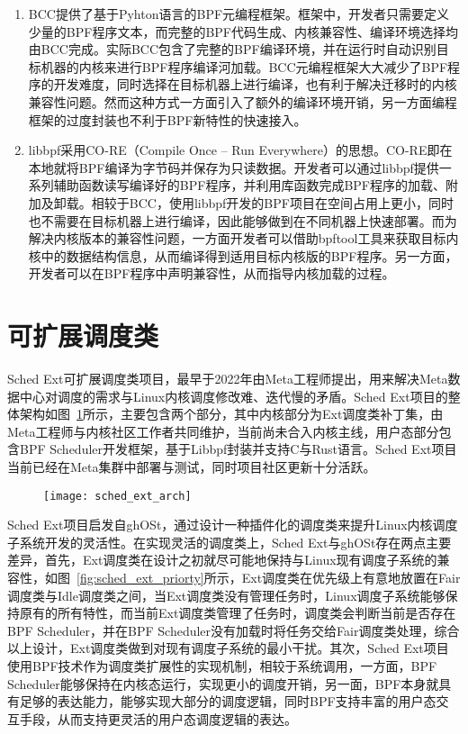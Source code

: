 \begin{enumerate}
    \item BCC提供了基于Pyhton语言的BPF元编程框架。框架中，开发者只需要定义少量的BPF程序文本，而完整的BPF代码生成、内核兼容性、编译环境选择均由BCC完成。实际BCC包含了完整的BPF编译环境，并在运行时自动识别目标机器的内核来进行BPF程序编译河加载。BCC元编程框架大大减少了BPF程序的开发难度，同时选择在目标机器上进行编译，也有利于解决迁移时的内核兼容性问题。然而这种方式一方面引入了额外的编译环境开销，另一方面编程框架的过度封装也不利于BPF新特性的快速接入。
    \item libbpf采用CO-RE（Compile Once – Run Everywhere）的思想。CO-RE即在本地就将BPF编译为字节码并保存为只读数据。开发者可以通过libbpf提供一系列辅助函数读写编译好的BPF程序，并利用库函数完成BPF程序的加载、附加及卸载。相较于BCC，使用libbpf开发的BPF项目在空间占用上更小，同时也不需要在目标机器上进行编译，因此能够做到在不同机器上快速部署。而为解决内核版本的兼容性问题，一方面开发者可以借助bpftool工具来获取目标内核中的数据结构信息，从而编译得到适用目标内核版的BPF程序。另一方面，开发者可以在BPF程序中声明兼容性，从而指导内核加载的过程。
\end{enumerate}

\section{可扩展调度类}

Sched Ext可扩展调度类项目\citep{schedext}，最早于2022年由Meta工程师提出，用来解决Meta数据中心对调度的需求与Linux内核调度修改难、迭代慢的矛盾。Sched Ext项目的整体架构如图~\ref{fig:sched_ext_arch}所示，主要包含两个部分，其中内核部分为Ext调度类补丁集，由Meta工程师与内核社区工作者共同维护，当前尚未合入内核主线，用户态部分包含BPF Scheduler开发框架，基于Libbpf封装并支持C与Rust语言。Sched Ext项目当前已经在Meta集群中部署与测试，同时项目社区更新十分活跃。

\begin{figure}[!htbp]
    \centering
    \texttt{[image: sched\_ext\_arch]}
    \label{fig:sched_ext_arch}
\end{figure}

Sched Ext项目启发自ghOSt\citep{humphries2021ghost}，通过设计一种插件化的调度类来提升Linux内核调度子系统开发的灵活性。在实现灵活的调度类上，Sched Ext与ghOSt存在两点主要差异，首先，Ext调度类在设计之初就尽可能地保持与Linux现有调度子系统的兼容性，如图~\ref{fig:sched_ext_priorty}所示，Ext调度类在优先级上有意地放置在Fair调度类与Idle调度类之间，当Ext调度类没有管理任务时，Linux调度子系统能够保持原有的所有特性，而当前Ext调度类管理了任务时，调度类会判断当前是否存在BPF Scheduler，并在BPF Scheduler没有加载时将任务交给Fair调度类处理，综合以上设计，Ext调度类做到对现有调度子系统的最小干扰。其次，Sched Ext项目使用BPF技术作为调度类扩展性的实现机制，相较于系统调用，一方面，BPF Scheduler能够保持在内核态运行，实现更小的调度开销，另一面，BPF本身就具有足够的表达能力，能够实现大部分的调度逻辑，同时BPF支持丰富的用户态交互手段，从而支持更灵活的用户态调度逻辑的表达。

